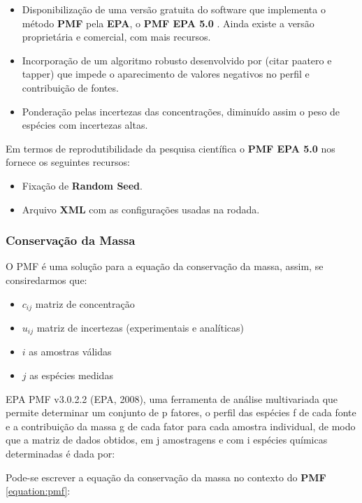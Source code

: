 \begin{itemize}
  \item Disponibilização de uma versão gratuita do software que implementa 
        o método \textbf{PMF} pela \textbf{EPA}, o \textbf{PMF EPA 5.0} 
        \citep{Norris:2014}. 
        Ainda existe a versão proprietária e comercial, com mais recursos.   
  \item Incorporação de um algoritmo robusto desenvolvido por (citar paatero e tapper) 
        que impede o aparecimento de valores negativos no perfil e 
        contribuição de fontes.
  \item Ponderação pelas incertezas das concentrações, diminuído assim o peso 
        de espécies com incertezas altas.
\end{itemize}  

Em termos de reprodutibilidade da pesquisa científica o \textbf{PMF EPA 5.0} 
nos fornece os seguintes recursos:

\begin{itemize}
  \item Fixação de \textbf{Random Seed}.%
  \item Arquivo \textbf{XML} com as configurações usadas na rodada. 
\end{itemize} 

\subsubsection{Conservação da Massa}
O PMF é uma solução para a equação da conservação da massa, assim, se 
consiredarmos que:
\begin{itemize}
  \item $c_{ij}$ matriz de concentração
  \item $u_{ij}$ matriz de incertezas (experimentais e analíticas)
  \item $i$ as amostras válidas
  \item $j$ as espécies medidas
\end{itemize}

EPA PMF v3.0.2.2 (EPA, 2008), uma ferramenta de análise multivariada que permite determinar um conjunto de p fatores, o perfil das espécies f de cada fonte e a contribuição da massa g de cada fator para cada amostra individual, de modo que a matriz de dados obtidos, em j amostragens e com i espécies químicas determinadas é dada por:

Pode-se escrever a equação da conservação da massa no 
contexto do \textbf{PMF} \ref{equation:pmf}: 

